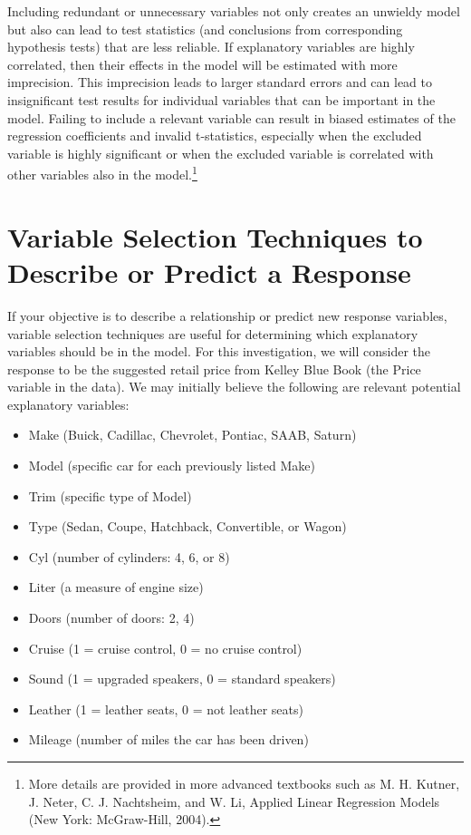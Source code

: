 \documentclass[
]{report}
\providecommand{\tightlist}{%
  \setlength{\itemsep}{0pt}\setlength{\parskip}{0pt}}
\begin{document}
Including redundant or unnecessary variables not only creates an unwieldy model but also can lead to test statistics (and conclusions from corresponding hypothesis tests) that are less reliable. If explanatory variables are highly correlated, then their effects in the model will be estimated with more imprecision. This imprecision leads to larger standard errors and can lead to insignificant test results for individual variables that can be important in the model. Failing to include a relevant variable can result in biased estimates of the regression coefficients and invalid t-statistics, especially when the excluded variable is highly significant or when the excluded variable is correlated with other variables also in the model.\footnote{More details are provided in more advanced textbooks such as M. H. Kutner, J. Neter, C. J. Nachtsheim, and W. Li, Applied Linear Regression Models (New York: McGraw-Hill, 2004).}

\section{\texorpdfstring{\textbf{Variable Selection Techniques to Describe or Predict a Response}}{Variable Selection Techniques to Describe or Predict a Response}}\label{variable-selection-techniques-to-describe-or-predict-a-response}

If your objective is to describe a relationship or predict new response variables, variable selection techniques are useful for determining which explanatory variables should be in the model. For this investigation, we will consider the response to be the suggested retail price from Kelley Blue Book (the Price variable in the data). We may initially believe the following are relevant potential explanatory variables:

\begin{itemize}
\tightlist
\item
  Make (Buick, Cadillac, Chevrolet, Pontiac, SAAB, Saturn)
\item
  Model (specific car for each previously listed Make)
\item
  Trim (specific type of Model)
\item
  Type (Sedan, Coupe, Hatchback, Convertible, or Wagon)
\item
  Cyl (number of cylinders: 4, 6, or 8)
\item
  Liter (a measure of engine size)
\item
  Doors (number of doors: 2, 4)
\item
  Cruise (1 = cruise control, 0 = no cruise control)
\item
  Sound (1 = upgraded speakers, 0 = standard speakers)
\item
  Leather (1 = leather seats, 0 = not leather seats)
\item
  Mileage (number of miles the car has been driven)
\end{itemize}
\end{document}
